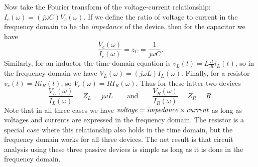 \documentclass[10pt]{beamer}
\begin{document}
Now take the Fourier transform of the voltage-current relationship:  $I_c(\omega) = (j \omega C) V_c(\omega)$.  If we define the ratio of voltage to current in the frequency domain to be the {\em impedance} of the device, then for the capacitor we have
\begin{equation*}
  \frac{V_c(\omega)}{I_c(\omega)} = z_C = \frac{1}{j \omega C}.
\end{equation*}
Similarly, for an inductor the time-domain equation is $v_L(t) = L \frac{d}{dt} i_L(t)$, so in the frequency domain we have $V_L(\omega) = (j \omega L) I_L(\omega)$.  Finally, for a resistor $v_r(t) = R i_R(t)$, so $V_r(\omega) = R I_R(\omega)$.  Thus for these latter two devices
\begin{equation*}
  \frac{V_L(\omega)}{I_L(\omega)} = Z_L = j \omega L \qquad \text{and} \qquad
  \frac{V_R(\omega)}{I_R(\omega)} = Z_R = R.
\end{equation*}
Note that in all three cases we have $\text{\em voltage} = \text{\em impedance} \times \text{\em current}$ as long as voltages and currents are expressed in the frequency domain.  The resistor is a special case where this relationship also holds in the time domain, but the frequency domain works for all three devices.  The net result is that circuit analysis using these three passive devices is simple as long as it is done in the frequency domain.  
\end{document}
